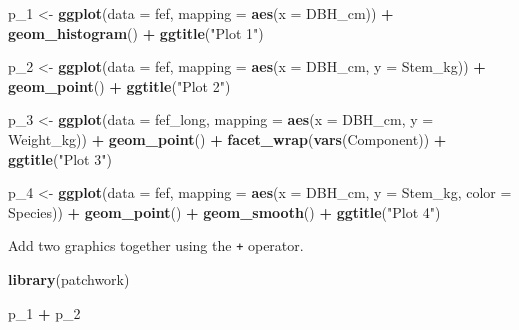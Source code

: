 \documentclass[
  11pt,
]{krantz}
\newenvironment{Shaded}{\begin{snugshade}}{\end{snugshade}}
\newcommand{\DataTypeTok}[1]{\textcolor[rgb]{0.13,0.29,0.53}{#1}}
\newcommand{\DecValTok}[1]{\textcolor[rgb]{0.00,0.00,0.81}{#1}}
\newcommand{\KeywordTok}[1]{\textcolor[rgb]{0.13,0.29,0.53}{\textbf{#1}}}
\newcommand{\NormalTok}[1]{#1}
\newcommand{\OperatorTok}[1]{\textcolor[rgb]{0.81,0.36,0.00}{\textbf{#1}}}
\newcommand{\StringTok}[1]{\textcolor[rgb]{0.31,0.60,0.02}{#1}}
\theoremstyle{definition}
\theoremstyle{definition}
\theoremstyle{definition}
\theoremstyle{definition}
\theoremstyle{remark}
\begin{document}
\begin{Shaded}
\begin{Highlighting}[]
\NormalTok{p\_}\DecValTok{1}\NormalTok{ \textless{}{-}}\StringTok{ }\KeywordTok{ggplot}\NormalTok{(}\DataTypeTok{data =}\NormalTok{ fef, }
              \DataTypeTok{mapping =} \KeywordTok{aes}\NormalTok{(}\DataTypeTok{x =}\NormalTok{ DBH\_cm)) }\OperatorTok{+}
\StringTok{  }\KeywordTok{geom\_histogram}\NormalTok{() }\OperatorTok{+}\StringTok{ }
\StringTok{  }\KeywordTok{ggtitle}\NormalTok{(}\StringTok{"Plot 1"}\NormalTok{)}

\NormalTok{p\_}\DecValTok{2}\NormalTok{ \textless{}{-}}\StringTok{ }\KeywordTok{ggplot}\NormalTok{(}\DataTypeTok{data =}\NormalTok{ fef, }
              \DataTypeTok{mapping =} \KeywordTok{aes}\NormalTok{(}\DataTypeTok{x =}\NormalTok{ DBH\_cm, }\DataTypeTok{y =}\NormalTok{ Stem\_kg)) }\OperatorTok{+}\StringTok{ }
\StringTok{  }\KeywordTok{geom\_point}\NormalTok{() }\OperatorTok{+}\StringTok{ }
\StringTok{  }\KeywordTok{ggtitle}\NormalTok{(}\StringTok{"Plot 2"}\NormalTok{)}

\NormalTok{p\_}\DecValTok{3}\NormalTok{ \textless{}{-}}\StringTok{ }\KeywordTok{ggplot}\NormalTok{(}\DataTypeTok{data =}\NormalTok{ fef\_long, }
              \DataTypeTok{mapping =} \KeywordTok{aes}\NormalTok{(}\DataTypeTok{x =}\NormalTok{ DBH\_cm, }\DataTypeTok{y =}\NormalTok{ Weight\_kg)) }\OperatorTok{+}\StringTok{ }
\StringTok{  }\KeywordTok{geom\_point}\NormalTok{() }\OperatorTok{+}
\StringTok{  }\KeywordTok{facet\_wrap}\NormalTok{(}\KeywordTok{vars}\NormalTok{(Component)) }\OperatorTok{+}\StringTok{ }
\StringTok{  }\KeywordTok{ggtitle}\NormalTok{(}\StringTok{"Plot 3"}\NormalTok{)}

\NormalTok{p\_}\DecValTok{4}\NormalTok{ \textless{}{-}}\StringTok{ }\KeywordTok{ggplot}\NormalTok{(}\DataTypeTok{data =}\NormalTok{ fef, }
              \DataTypeTok{mapping =} \KeywordTok{aes}\NormalTok{(}\DataTypeTok{x =}\NormalTok{ DBH\_cm, }\DataTypeTok{y =}\NormalTok{ Stem\_kg, }\DataTypeTok{color =}\NormalTok{ Species)) }\OperatorTok{+}\StringTok{ }
\StringTok{  }\KeywordTok{geom\_point}\NormalTok{() }\OperatorTok{+}
\StringTok{  }\KeywordTok{geom\_smooth}\NormalTok{() }\OperatorTok{+}\StringTok{ }
\StringTok{  }\KeywordTok{ggtitle}\NormalTok{(}\StringTok{"Plot 4"}\NormalTok{)}
\end{Highlighting}
\end{Shaded}

Add two graphics together using the \texttt{+} operator.

\begin{Shaded}
\begin{Highlighting}[]
\KeywordTok{library}\NormalTok{(patchwork)}

\NormalTok{p\_}\DecValTok{1} \OperatorTok{+}\StringTok{ }\NormalTok{p\_}\DecValTok{2}
\end{Highlighting}
\end{Shaded}
\end{document}
